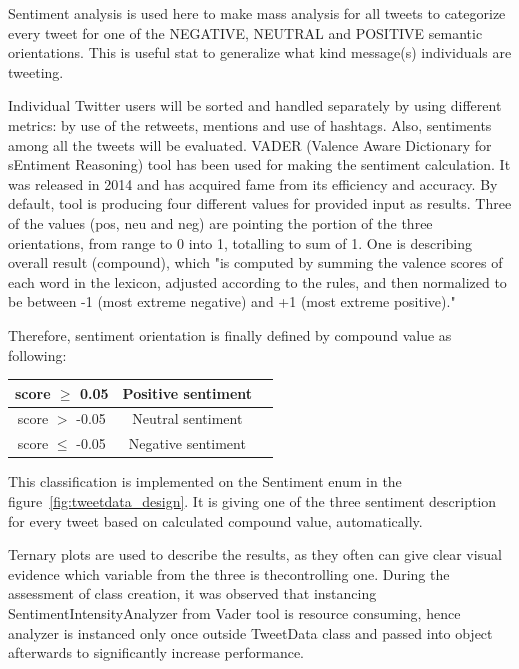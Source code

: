 \documentclass[conference]{IEEEtran}
\begin{document}
Sentiment analysis is used here to make mass analysis for all tweets to categorize every tweet for one of the NEGATIVE, NEUTRAL and POSITIVE semantic orientations.
This is useful stat to generalize what kind message(s) individuals are tweeting.

Individual Twitter users will be sorted and handled separately by using different metrics: by use of the retweets, mentions and use of hashtags.
Also, sentiments among all the tweets will be evaluated.
VADER (Valence  Aware  Dictionary  for  sEntiment  Reasoning) tool\cite{Hutto_Gilbert_2014} has been used for making the sentiment calculation.
It was released in 2014 and has acquired fame from its efficiency and accuracy.
By default, tool is producing four different values for provided input as results.
Three of the values (pos, neu and neg) are pointing the portion of the three orientations, from range to 0 into 1, totalling to sum of 1.
One is describing overall result (compound), which "is computed by summing the valence scores of each word in the lexicon, adjusted according to the rules, and then normalized to be between -1 (most extreme negative) and +1 (most extreme positive)."

Therefore, sentiment orientation is finally defined by compound value as following:

\begin{center}
\begin{tabular}{ |c|c|c| }
 \hline
 score $\geq$ 0.05 & Positive sentiment \\
 \hline
 score $>$ -0.05 & Neutral sentiment \\
 \hline
 score $\leq$ -0.05 & Negative sentiment \\
 \hline
\end{tabular}
\end{center}

This classification is implemented on the Sentiment enum in the figure~\ref{fig:tweetdata_design}.
It is giving one of the three sentiment description for every tweet based on calculated compound value, automatically.

Ternary plots are used to describe the results, as they often can give clear visual evidence which variable from the three is  thecontrolling one.
During the assessment of class creation, it was observed that instancing SentimentIntensityAnalyzer from Vader tool is resource consuming, hence
analyzer is instanced only once outside TweetData class and passed into object afterwards to significantly increase performance.
\end{document}
